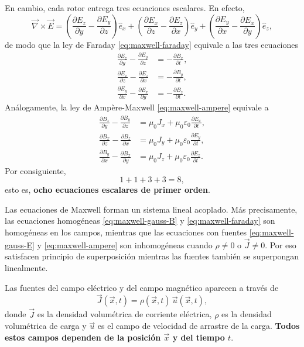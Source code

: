 \documentclass[12pt,a4paper]{article}
\theoremstyle{definition}
\theoremstyle{plain}
\numberwithin{equation}{section}
\theoremstyle{remark}
\newcommand{\E}{\vec{E}}
\newcommand{\J}{\vec{J}}
\begin{document}
En cambio, cada rotor entrega tres ecuaciones escalares. En efecto,
\begin{equation*}
    \vec\nabla\times\E=
    \left(\frac{\partial E_z}{\partial y}-\frac{\partial E_y}{\partial z}\right)\hat e_x+
    \left(\frac{\partial E_x}{\partial z}-\frac{\partial E_z}{\partial x}\right)\hat e_y+
    \left(\frac{\partial E_y}{\partial x}-\frac{\partial E_x}{\partial y}\right)\hat e_z,
\end{equation*}
de modo que la ley de Faraday \eqref{eq:maxwell-faraday} equivale a las tres ecuaciones
\begin{align*}
    \frac{\partial E_z}{\partial y}-\frac{\partial E_y}{\partial z} &= -\frac{\partial B_x}{\partial t},\\
    \frac{\partial E_x}{\partial z}-\frac{\partial E_z}{\partial x} &= -\frac{\partial B_y}{\partial t},\\
    \frac{\partial E_y}{\partial x}-\frac{\partial E_x}{\partial y} &= -\frac{\partial B_z}{\partial t}.
\end{align*}
Análogamente, la ley de Ampère-Maxwell \eqref{eq:maxwell-ampere} equivale a
\begin{align*}
    \frac{\partial B_z}{\partial y}-\frac{\partial B_y}{\partial z} &= \mu_0 J_x+\mu_0\varepsilon_0\frac{\partial E_x}{\partial t},\\
    \frac{\partial B_x}{\partial z}-\frac{\partial B_z}{\partial x} &= \mu_0 J_y+\mu_0\varepsilon_0\frac{\partial E_y}{\partial t},\\
    \frac{\partial B_y}{\partial x}-\frac{\partial B_x}{\partial y} &= \mu_0 J_z+\mu_0\varepsilon_0\frac{\partial E_z}{\partial t}.
\end{align*}
Por consiguiente,
\begin{equation*}
    1+1+3+3=8,
\end{equation*}
esto es, \textbf{ocho ecuaciones escalares de primer orden}.

Las ecuaciones de Maxwell forman un sistema lineal acoplado. Más precisamente, las ecuaciones homogéneas \eqref{eq:maxwell-gauss-B} y \eqref{eq:maxwell-faraday} son homogéneas en los campos, mientras que las ecuaciones con fuentes \eqref{eq:maxwell-gauss-E} y \eqref{eq:maxwell-ampere} son inhomogéneas cuando $\rho\neq 0$ o $\J\neq 0$. Por eso satisfacen principio de superposición mientras las fuentes también se superpongan linealmente.

Las fuentes del campo eléctrico y del campo magnético aparecen a través de
\begin{equation*}
    \J(\vec x,t)=\rho(\vec x,t)\,\vec u(\vec x,t),
\end{equation*}
donde $\J$ es la densidad volumétrica de corriente eléctrica, $\rho$ es la densidad volumétrica de carga y $\vec u$ es el campo de velocidad de arrastre de la carga. \textbf{Todos estos campos dependen de la posición $\vec x$ y del tiempo $t$}. 
\end{document}
